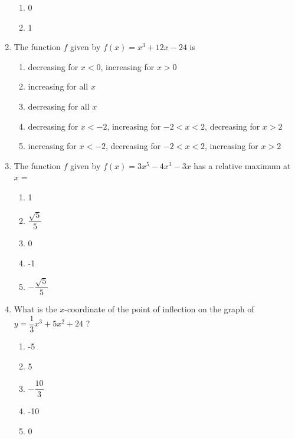 \documentclass{article}
\begin{document}
\begin{enumerate}
\begin{minipage}[t]{\linewidth}
\begin{enumerate}
			\item 0
			\item 1
		\end{enumerate}
	\end{minipage}
	\item
	\begin{minipage}[t]{\linewidth}
		The function \(f\) given by \(f(x)=x^{3}+12 x-24\) is
\vspace{1em}
		\begin{enumerate}
		\itemsep1em
			\item decreasing for \({x}<0\), increasing for \({x}>0\)
			\item increasing for all \(x\)
			\item decreasing for all \(x\)
			\item decreasing for \({x}<-2\), increasing for \(-2<{x}<2\), decreasing for
\({x}>2\)
			\item increasing for \(x<-2\), decreasing for \(-2<x<2\), increasing for
\(x>2\)
		\end{enumerate}
	\end{minipage}
	\item
	\begin{minipage}[t]{\linewidth}
		The function \(f\) given by \(f(x)=3 x^{5}-4 x^{3}-3 x\) has a relative
maximum at \(x=\)
\vspace{1em}
		\begin{enumerate}
		\itemsep1em
			\item 1
			\item \(\dfrac{\sqrt{5}}{5}\)
			\item 0
			\item -1
			\item \(-\dfrac{\sqrt{5}}{5}\)
		\end{enumerate}
	\end{minipage}
	\item
	\begin{minipage}[t]{\linewidth}
		What is the \(x\)-coordinate of the point of inflection on the graph of
\(y=\dfrac{1}{3} x^{3}+5 x^{2}+24\) ?
\vspace{1em}
		\begin{enumerate}
		\itemsep1em
			\item -5
			\item 5
			\item \(-\dfrac{10}{3}\)
			\item -10
			\item 0
		\end{enumerate}
	\end{minipage}

\end{enumerate}
\end{document}
